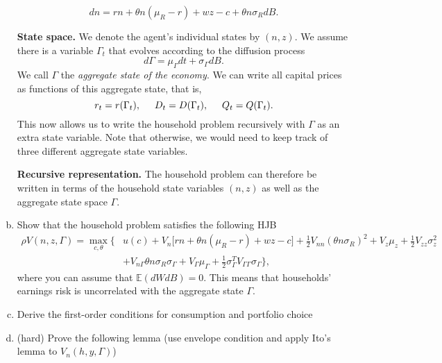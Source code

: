 \documentclass[11pt]{extarticle}
\theoremstyle{plain}
\theoremstyle{definition}
\begin{document}
\begin{enumerate}[(a)]
\begin{equation*}
	dn = rn + \theta n (\mu_R - r) + wz - c + \theta n \sigma_R dB. 
\end{equation*}



\vspace{5mm}
\noindent
\textbf{State space.} We denote the agent's individual states by $(n, z)$. We assume there is a variable $\Gamma_t$ that evolves according to the diffusion process 
\begin{equation*}
	d \Gamma = \mu_\Gamma dt + \sigma_\Gamma dB.
\end{equation*}
We call $\Gamma$ the \textit{aggregate state of the economy}. We can write all capital prices as functions of this aggregate state, that is, 
\begin{equation*}
	r_t = r(\Gamma_t), \hspace{5mm}	D_t = D(\Gamma_t), \hspace{5mm}	Q_t = Q(\Gamma_t).
\end{equation*}
This now allows us to write the household problem recursively with $\Gamma$ as an extra state variable. Note that otherwise, we would need to keep track of three different aggregate state variables. 


\vspace{5mm}
\noindent
\textbf{Recursive representation.} 
The household problem can therefore be written in terms of the household state variables $(n,z)$ as well as the aggregate state space $\Gamma$. 
\item Show that the household problem satisfies the following HJB
\begin{align*}
	\rho V(n,z,\Gamma) = \max_{c,\theta} \bigg\{  & u(c) + V_n \Big[ rn + \theta n (\mu_R - r) + wz - c \Big] + \frac{1}{2} V_{nn} (\theta n \sigma_R)^2 +  V_z \mu_z + \frac{1}{2} V_{zz} \sigma_z^2  \\
	& + V_{n \Gamma} \theta n \sigma_R \sigma_\Gamma + V_\Gamma \mu_\Gamma + \frac{1}{2} \sigma_\Gamma^T V_{\Gamma \Gamma} \sigma_\Gamma \bigg\},
\end{align*}
where you can assume that $\mathbb{E}(dW dB) = 0$. This means that households' earnings risk is uncorrelated with the aggregate state $\Gamma$.



\item Derive the first-order conditions for consumption and portfolio choice


\item (hard) Prove the following lemma (use envelope condition and apply Ito's lemma to $V_n(h,y,\Gamma)$)


\end{enumerate}
\end{document}
